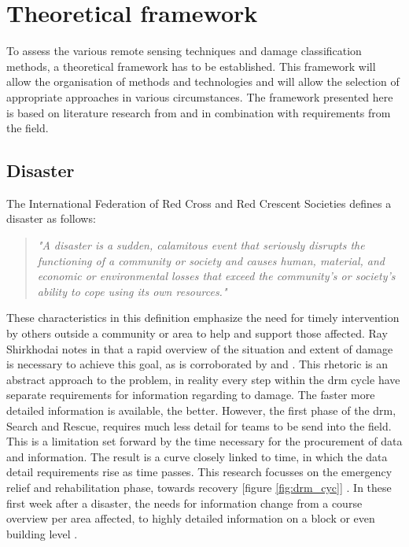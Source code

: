 \chapter{Theoretical framework} \label{framework}

To assess the various remote sensing techniques and damage classification methods, a theoretical framework has to be established. This framework will allow the organisation of methods and technologies and will allow the selection of appropriate approaches in various circumstances. The framework presented here is based on literature research from \citet{Dong2013} and \citet{Kerle2008} in combination with requirements from the field.

\section{Disaster}\label{sec:dis}
The International Federation of Red Cross and Red Crescent Societies \citeyearpar{IFRC2017} defines a disaster as follows: 
\begin{quote}
	\textit{"A disaster is a sudden, calamitous event that seriously disrupts the functioning of a community or society and causes human, material, and economic or environmental losses that exceed the community’s or society’s ability to cope using its own resources."}
\end{quote}
These characteristics in this definition emphasize the need for timely intervention by others outside a community or area to help and support those affected. Ray Shirkhodai notes in \citet[p. i]{AlAchkar2008} that a rapid overview of the situation and extent of damage is necessary to achieve this goal, as is corroborated by \citet{Okada2000} and \citet{Schweier2006}. This rhetoric is an abstract approach to the problem, in reality every step within the \ac{drm} cycle have separate requirements for information regarding to damage. The faster more detailed information is available, the better. However, the first phase of the \ac{drm}, Search and Rescue, requires much less detail for teams to be send into the field. This is a limitation set forward by the time necessary for the procurement of data and information. The result is a curve closely linked to time, in which the data detail requirements rise as time passes. This research focusses on the emergency relief and rehabilitation phase, towards recovery [figure \ref{fig:drm_cyc}] \citep{Wisner2002, Crutchfield2013}. In these first week after a disaster, the needs for information change from a course overview per area affected, to highly detailed information on a block or even building level \citep{Ozisik2004}.\\

